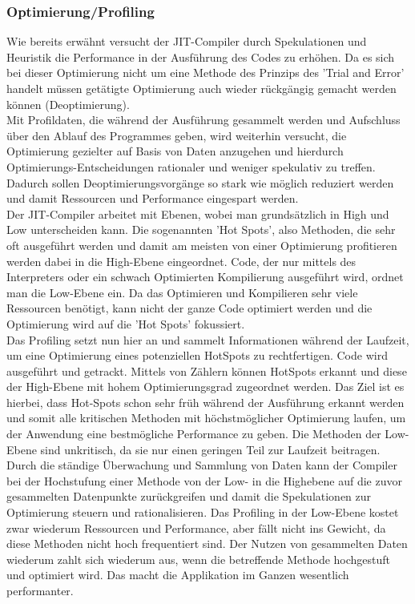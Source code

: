\subsubsection{Optimierung/Profiling}
Wie bereits erwähnt versucht der \ac{JIT}-Compiler durch Spekulationen und Heuristik die Performance in der Ausführung des Codes zu erhöhen. Da es sich bei dieser Optimierung nicht um eine Methode des Prinzips des 'Trial and Error' handelt müssen getätigte Optimierung auch wieder rückgängig gemacht werden können (Deoptimierung).\\
Mit Profildaten, die während der Ausführung gesammelt werden und Aufschluss über den Ablauf des Programmes geben, wird weiterhin versucht, die Optimierung gezielter auf Basis von Daten anzugehen und hierdurch Optimierungs-Entscheidungen rationaler und weniger spekulativ zu treffen. Dadurch sollen Deoptimierungsvorgänge so stark wie möglich reduziert werden und damit Ressourcen und Performance eingespart werden.\\
Der \ac{JIT}-Compiler arbeitet mit Ebenen, wobei man grundsätzlich  in High und Low unterscheiden kann. Die sogenannten 'Hot Spots', also Methoden, die sehr oft ausgeführt werden und damit am meisten von einer Optimierung profitieren werden dabei in die High-Ebene eingeordnet. Code, der nur mittels des Interpreters oder ein schwach Optimierten Kompilierung ausgeführt wird, ordnet man die Low-Ebene ein. Da das Optimieren und Kompilieren sehr viele Ressourcen benötigt, kann nicht der ganze Code optimiert werden und die Optimierung wird auf die 'Hot Spots' fokussiert.\\
Das Profiling setzt nun hier an und sammelt Informationen während der Laufzeit, um eine Optimierung eines potenziellen HotSpots zu rechtfertigen. Code wird ausgeführt und getrackt. Mittels von Zählern können HotSpots erkannt und diese der High-Ebene mit hohem Optimierungsgrad zugeordnet werden. Das Ziel ist es hierbei, dass Hot-Spots schon sehr früh während der Ausführung erkannt werden und somit alle kritischen Methoden mit höchstmöglicher Optimierung laufen, um der Anwendung eine bestmögliche Performance zu geben. Die Methoden der Low-Ebene sind unkritisch, da sie nur einen geringen Teil zur Laufzeit beitragen. \\
Durch die ständige Überwachung und Sammlung von Daten kann der Compiler bei der Hochstufung einer Methode von der Low- in die Highebene auf die zuvor gesammelten Datenpunkte zurückgreifen und damit die Spekulationen zur Optimierung steuern und rationalisieren. Das Profiling in der Low-Ebene kostet zwar wiederum Ressourcen und Performance, aber fällt nicht ins Gewicht, da diese Methoden nicht hoch frequentiert sind. Der Nutzen von gesammelten Daten wiederum zahlt sich wiederum aus, wenn die betreffende Methode hochgestuft und optimiert wird. Das macht die Applikation im Ganzen wesentlich performanter.\\
